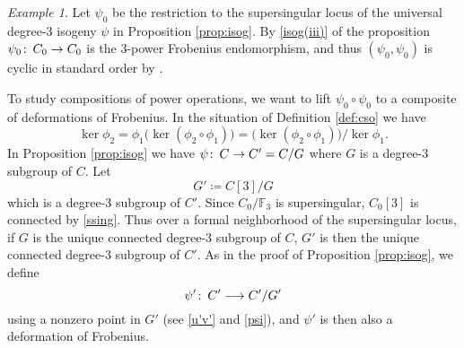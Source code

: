 \documentclass{gtpart}
\theoremstyle{definition}
\theoremstyle{remark}
\newtheorem{ex}[thm]{Example}
\def\co{\colon\thinspace}
\newcommand{\mb}[1]{\mathbb{#1}}
\newcommand{\BF}{{\mb F}}
\newcommand{\ce}{\coloneqq}
\numberwithin{equation}{section}
\numberwithin{thm}{section}
\begin{document}
\begin{ex}
\label{ex:DF}
 Let $\psi_0$ be the restriction to the supersingular locus of the 
 universal degree-3 isogeny $\psi$ in Proposition \ref{prop:isog}.  By 
 \eqref{isog(iii)} of the proposition $\psi_0 \co C_0 \to C_0$ is the 
 3-power Frobenius endomorphism, and thus $(\psi_0,\psi_0)$ is cyclic in 
 standard order by \cite[12.2.4(1)]{KM}.  

 To study compositions of power operations, we want to lift 
 $\psi_0 \circ \psi_0$ to a composite of deformations of Frobenius.  In 
 the situation of Definition \ref{def:cso} we have 
 \[
  \ker \phi_2 = \phi_1 \big( \ker(\phi_2 \circ \phi_1) \big) 
  = \big( \ker(\phi_2 \circ \phi_1) \big) \big/ \ker \phi_1.  
 \]
 In Proposition \ref{prop:isog} we have $\psi \co C \to C' = C/G$ where 
 $G$ is a degree-3 subgroup of $C$.  Let 
 \[
  G' \ce C[3]/G 
 \]
 which is a degree-3 subgroup of $C'$.  Since $C_0/\BF_3$ is 
 supersingular, $C_0[3]$ is connected by \eqref{ssing}.  Thus over a 
 formal neighborhood of the supersingular locus, if $G$ is the unique 
 connected degree-3 subgroup of $C$, $G'$ is then the unique connected 
 degree-3 subgroup of $C'$.  As in the proof of Proposition 
 \ref{prop:isog}, we define 
 \[
  \psi' \co C' \longrightarrow C'/G' 
 \]
 using a nonzero point in $G'$ (see \eqref{u'v'} and \eqref{psi}), and 
 $\psi'$ is then also a deformation of Frobenius.  
\end{ex}
\end{document}
